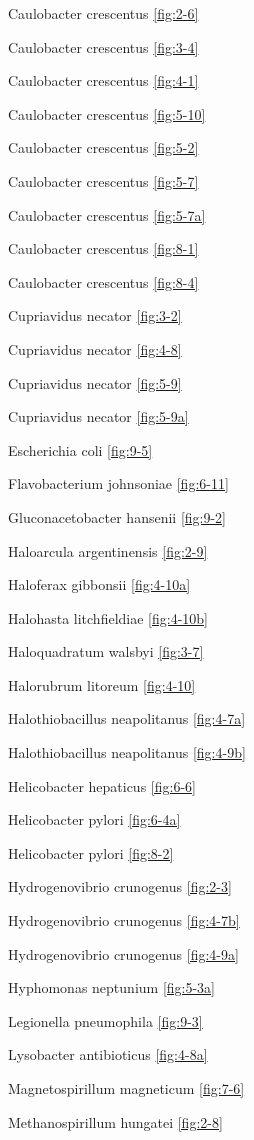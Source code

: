 \documentclass[]{tufte-book}
\begin{document}
Caulobacter crescentus \ref{fig:2-6}

Caulobacter crescentus \ref{fig:3-4}

Caulobacter crescentus \ref{fig:4-1}

Caulobacter crescentus \ref{fig:5-10}

Caulobacter crescentus \ref{fig:5-2}

Caulobacter crescentus \ref{fig:5-7}

Caulobacter crescentus \ref{fig:5-7a}

Caulobacter crescentus \ref{fig:8-1}

Caulobacter crescentus \ref{fig:8-4}

Cupriavidus necator \ref{fig:3-2}

Cupriavidus necator \ref{fig:4-8}

Cupriavidus necator \ref{fig:5-9}

Cupriavidus necator \ref{fig:5-9a}

Escherichia coli \ref{fig:9-5}

Flavobacterium johnsoniae \ref{fig:6-11}

Gluconacetobacter hansenii \ref{fig:9-2}

Haloarcula argentinensis \ref{fig:2-9}

Haloferax gibbonsii \ref{fig:4-10a}

Halohasta litchfieldiae \ref{fig:4-10b}

Haloquadratum walsbyi \ref{fig:3-7}

Halorubrum litoreum \ref{fig:4-10}

Halothiobacillus neapolitanus \ref{fig:4-7a}

Halothiobacillus neapolitanus \ref{fig:4-9b}

Helicobacter hepaticus \ref{fig:6-6}

Helicobacter pylori \ref{fig:6-4a}

Helicobacter pylori \ref{fig:8-2}

Hydrogenovibrio crunogenus \ref{fig:2-3}

Hydrogenovibrio crunogenus \ref{fig:4-7b}

Hydrogenovibrio crunogenus \ref{fig:4-9a}

Hyphomonas neptunium \ref{fig:5-3a}

Legionella pneumophila \ref{fig:9-3}

Lysobacter antibioticus \ref{fig:4-8a}

Magnetospirillum magneticum \ref{fig:7-6}

Methanospirillum hungatei \ref{fig:2-8}
\end{document}
